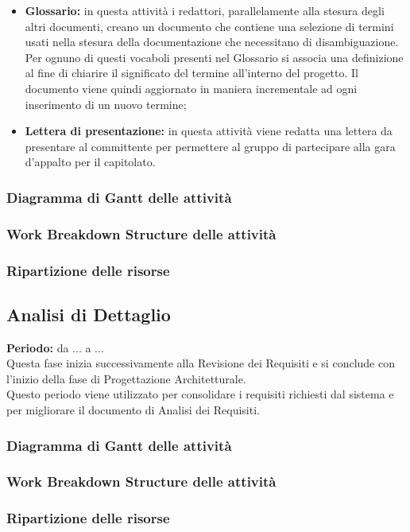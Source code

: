 \begin{itemize}
		\item \textbf{Glossario:} in questa attività i redattori, parallelamente alla stesura degli altri documenti, creano un documento che contiene una selezione di termini usati nella stesura della documentazione che necessitano di disambiguazione. Per ognuno di questi vocaboli presenti nel Glossario si associa una definizione al fine di chiarire il significato del termine all'interno del progetto. Il documento viene quindi aggiornato in maniera incrementale ad ogni inserimento di un nuovo termine; \\
		\item \textbf{Lettera di presentazione:} in questa attività viene redatta una lettera da presentare al committente per permettere al gruppo di partecipare alla gara d'appalto per il capitolato.
	\end{itemize}
\subsubsection{Diagramma di Gantt delle attività}
\subsubsection{Work Breakdown Structure delle attività}
\subsubsection{Ripartizione delle risorse}
\subsection{Analisi di Dettaglio}
	\textbf{Periodo:} da ... a ... \\
	Questa fase inizia successivamente alla Revisione dei Requisiti e si conclude con l'inizio della fase di Progettazione Architetturale. \\
	Questo periodo viene utilizzato per consolidare i requisiti richiesti dal sistema e per
migliorare il documento di Analisi dei Requisiti.
\subsubsection{Diagramma di Gantt delle attività}
\subsubsection{Work Breakdown Structure delle attività}
\subsubsection{Ripartizione delle risorse}
